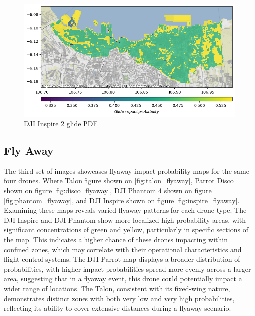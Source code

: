 \documentclass[12pt]{report}
\begin{document}
        \begin{figure}[H]
            \centering
            \includegraphics[width=\textwidth]{Plot/inspire/glide_pdf.png}
            \caption{DJI Inspire 2 glide PDF}
            \label{fig:inspire_glide}
        \end{figure}
        \subsection{Fly Away}
        The third set of images showcases flyaway impact probability maps for the same four drones.  Where Talon figure
        shown on \ref{fig:talon_flyaway}, Parrot Disco shown on figure \ref{fig:disco_flyaway}, DJI Phantom 4 shown on
        figure \ref{fig:phantom_flyaway}, and DJI Inspire shown on figure \ref{fig:inspire_flyaway}. Examining these
        maps reveals varied flyaway patterns for each drone type. The DJI Inspire and DJI Phantom show more localized
        high-probability areas, with significant concentrations of green and yellow, particularly in specific sections
        of the map. This indicates a higher chance of these drones impacting within confined zones, which may correlate
        with their operational characteristics and flight control systems. The DJI Parrot map displays a broader
        distribution of probabilities, with higher impact probabilities spread more evenly across a larger area,
        suggesting that in a flyaway event, this drone could potentially impact a wider range of locations. The Talon,
        consistent with its fixed-wing nature, demonstrates distinct zones with both very low and very high
        probabilities, reflecting its ability to cover extensive distances during a flyaway scenario.
\end{document}
